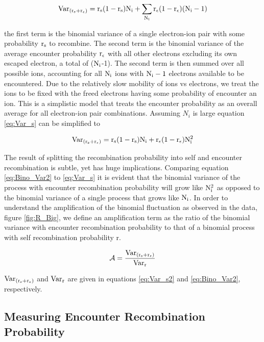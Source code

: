 \begin{equation}
\rm Var_{(r_s + r_\epsilon)} = r_s(1-r_s)N_i + \sum\limits_{N_i} r_\epsilon(1-r_\epsilon)(N_i-1)
\label{eq:Var_s}
\end{equation}

\noindent the first term is the binomial variance of a single electron-ion pair with some probability $\rm r_s$ to recombine. The second term is the binomial variance of the average encounter probability $\rm r_\epsilon$ with all other electrons excluding its own escaped electron, a total of ($\rm N_i$-1). The second term is then summed over all possible ions, accounting for all $\rm N_i$ ions with $\rm N_i -1$ electrons available to be encountered. Due to the relatively slow mobility of ions vs electrons, we treat the ions to be fixed with the freed electrons having some probability of encounter an ion. This is a simplistic model that treats the encounter probability as an overall average for all electron-ion pair combinations. Assuming $N_i$ is large equation \ref{eq:Var_s} can be simplified to 

\begin{equation}
\rm Var_{(r_s + r_\epsilon)} = r_s(1-r_s)N_i + r_\epsilon(1-r_\epsilon)N_i^2
\label{eq:Var_s2}
\end{equation}

The result of splitting the recombination probability into self and encounter recombination is subtle, yet has huge implications. Comparing equation \ref{eq:Bino_Var2} to \ref{eq:Var_s} it is evident that the binomial variance of the process with encounter recombination probability will grow like $\rm N_i^2$ as opposed to the binomial variance of a single process that grows like $\rm N_i$. In order to understand the amplification of the binomial fluctuation as observed in the data, figure \ref{fig:R_Big}, we define an amplification term as the ratio of the binomial variance with encounter recombination probability to that of a binomial process with self recombination probability r.

\begin{equation}
\rm \mathcal{A}= \frac{Var_{(r_s + r_\epsilon)}}{Var_r}
\label{eq:Amp}
\end{equation}

\noindent $\rm Var_{(r_s + r_\epsilon)}$ and $\rm Var_r$ are given in equations \ref{eq:Var_s2} and \ref{eq:Bino_Var2}, respectively. 


\subsection{Measuring Encounter Recombination Probability}

